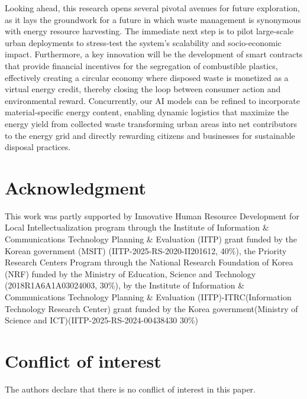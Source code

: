 \documentclass[final,5p,times,twocolumn]{elsarticle}
\begin{document}
Looking ahead, this research opens several pivotal avenues for future exploration, as it lays the groundwork for a future in which waste management is synonymous with energy resource harvesting. The immediate next step is to pilot large-scale urban deployments to stress-test the system's scalability and socio-economic impact. Furthermore, a key innovation will be the development of smart contracts that provide financial incentives for the segregation of combustible plastics, effectively creating a circular economy where disposed waste is monetized as a virtual energy credit, thereby closing the loop between consumer action and environmental reward. Concurrently, our AI models can be refined to incorporate material-specific energy content, enabling dynamic logistics that maximize the energy yield from collected waste transforming urban areas into net contributors to the energy grid and directly rewarding citizens and businesses for sustainable disposal practices.

\section*{Acknowledgment}
This work was partly supported by Innovative Human Resource Development for Local Intellectualization program through the Institute of Information \& Communications Technology Planning \& Evaluation (IITP) grant funded by the Korean government (MSIT) (IITP-2025-RS-2020-II201612, 40\%), the Priority Research Centers Program through the National Research Foundation of Korea (NRF) funded by the Ministry of Education, Science and Technology (2018R1A6A1A03024003, 30\%),
by the Institute of Information \& Communications Technology Planning \& Evaluation (IITP)-ITRC(Information Technology Research Center) grant funded by the Korea government(Ministry of Science and ICT)(IITP-2025-RS-2024-00438430 30\%)

\section*{Conflict of interest}
The authors declare that there is no conflict of interest in this paper.






\end{document}
